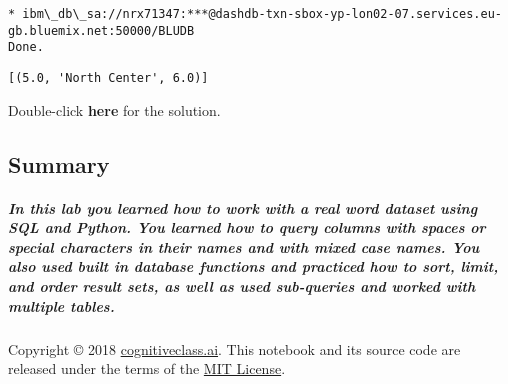 \documentclass[11pt]{article}
\makeatletter
\newcommand{\boxspacing}{\kern\kvtcb@left@rule\kern\kvtcb@boxsep}
\newcommand{\prompt}[4]{
        \ttfamily\llap{{\color{#2}[#3]:\hspace{3pt}#4}}\vspace{-\baselineskip}
    }
\makeatother
\begin{document}
    \begin{Verbatim}[commandchars=\\\{\}]
 * ibm\_db\_sa://nrx71347:***@dashdb-txn-sbox-yp-lon02-07.services.eu-
gb.bluemix.net:50000/BLUDB
Done.
    \end{Verbatim}

            \begin{tcolorbox}[breakable, size=fbox, boxrule=.5pt, pad at break*=1mm, opacityfill=0]
\prompt{Out}{outcolor}{50}{\boxspacing}
\begin{Verbatim}[commandchars=\\\{\}]
[(5.0, 'North Center', 6.0)]
\end{Verbatim}
\end{tcolorbox}
        
    Double-click \textbf{here} for the solution.

    \hypertarget{summary}{%
\subsection{Summary}\label{summary}}

\hypertarget{in-this-lab-you-learned-how-to-work-with-a-real-word-dataset-using-sql-and-python.-you-learned-how-to-query-columns-with-spaces-or-special-characters-in-their-names-and-with-mixed-case-names.-you-also-used-built-in-database-functions-and-practiced-how-to-sort-limit-and-order-result-sets-as-well-as-used-sub-queries-and-worked-with-multiple-tables.}{%
\subparagraph{In this lab you learned how to work with a real word
dataset using SQL and Python. You learned how to query columns with
spaces or special characters in their names and with mixed case names.
You also used built in database functions and practiced how to sort,
limit, and order result sets, as well as used sub-queries and worked
with multiple
tables.}\label{in-this-lab-you-learned-how-to-work-with-a-real-word-dataset-using-sql-and-python.-you-learned-how-to-query-columns-with-spaces-or-special-characters-in-their-names-and-with-mixed-case-names.-you-also-used-built-in-database-functions-and-practiced-how-to-sort-limit-and-order-result-sets-as-well-as-used-sub-queries-and-worked-with-multiple-tables.}}

    Copyright © 2018
\href{cognitiveclass.ai?utm_source=bducopyrightlink\&utm_medium=dswb\&utm_campaign=bdu}{cognitiveclass.ai}.
This notebook and its source code are released under the terms of the
\href{https://bigdatauniversity.com/mit-license/}{MIT License}.


    
    
    
\end{document}
